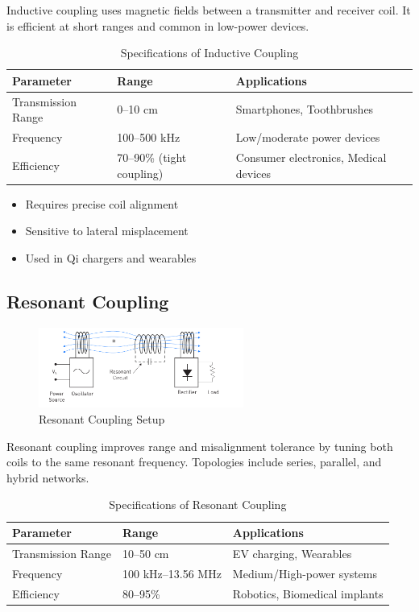 \documentclass[12pt,a4paper]{report}
\begin{document}
\quad Inductive coupling uses magnetic fields between a transmitter and receiver coil. It is efficient at short ranges and common in low-power devices.\cite{erickson2020resonant}

\begin{table}[H]
\centering
\caption{Specifications of Inductive Coupling}
\begin{tabular}{|p{4cm}|p{4cm}|p{6cm}|}
\hline
\textbf{Parameter} & \textbf{Range} & \textbf{Applications} \\
\hline
Transmission Range & 0--10 cm & Smartphones, Toothbrushes \\
\hline
Frequency & 100--500 kHz & Low/moderate power devices \\
\hline
Efficiency & 70--90\% (tight coupling) & Consumer electronics, Medical devices \\
\hline
\end{tabular}
\end{table}

\begin{itemize}
    \item Requires precise coil alignment
    \item Sensitive to lateral misplacement
    \item Used in Qi chargers and wearables
\end{itemize}

\subsection{Resonant Coupling}
\begin{figure}[H]
    \centering
    \includegraphics[width=0.6\textwidth]{image.png}
    \caption{Resonant Coupling Setup}
\end{figure}

\quad Resonant coupling improves range and misalignment tolerance by tuning both coils to the same resonant frequency. Topologies include series, parallel, and hybrid networks.\cite{li2022singleended}\cite{erickson2020resonant}

\begin{table}[H]
\centering
\caption{Specifications of Resonant Coupling}
\begin{tabular}{|p{4cm}|p{4.5cm}|p{5.5cm}|}
\hline
\textbf{Parameter} & \textbf{Range} & \textbf{Applications} \\
\hline
Transmission Range & 10--50 cm & EV charging, Wearables \\
\hline
Frequency & 100 kHz--13.56 MHz & Medium/High-power systems \\
\hline
Efficiency & 80--95\% & Robotics, Biomedical implants \\
\hline
\end{tabular}
\end{table}
\end{document}
